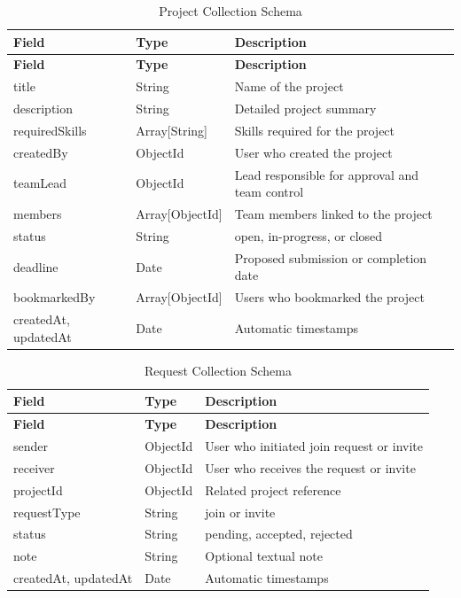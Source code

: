\documentclass[12pt,a4paper,oneside]{report}
\begin{document}
{\small
\setlength{\tabcolsep}{4pt}
\begin{longtable}{L{1.1in}L{0.95in}L{2.75in}}
\caption{Project Collection Schema} \\
\toprule
\textbf{Field} & \textbf{Type} & \textbf{Description} \\
\midrule
\endfirsthead
\toprule
\textbf{Field} & \textbf{Type} & \textbf{Description} \\
\midrule
\endhead
title & String & Name of the project \\
description & String & Detailed project summary \\
requiredSkills & Array[String] & Skills required for the project \\
createdBy & ObjectId & User who created the project \\
teamLead & ObjectId & Lead responsible for approval and team control \\
members & Array[ObjectId] & Team members linked to the project \\
status & String & open, in-progress, or closed \\
deadline & Date & Proposed submission or completion date \\
bookmarkedBy & Array[ObjectId] & Users who bookmarked the project \\
createdAt, updatedAt & Date & Automatic timestamps \\
\bottomrule
\end{longtable}
}

{\small
\setlength{\tabcolsep}{4pt}
\begin{longtable}{L{1.1in}L{0.95in}L{2.75in}}
\caption{Request Collection Schema} \\
\toprule
\textbf{Field} & \textbf{Type} & \textbf{Description} \\
\midrule
\endfirsthead
\toprule
\textbf{Field} & \textbf{Type} & \textbf{Description} \\
\midrule
\endhead
sender & ObjectId & User who initiated join request or invite \\
receiver & ObjectId & User who receives the request or invite \\
projectId & ObjectId & Related project reference \\
requestType & String & join or invite \\
status & String & pending, accepted, rejected \\
note & String & Optional textual note \\
createdAt, updatedAt & Date & Automatic timestamps \\
\bottomrule
\end{longtable}
}
\end{document}
